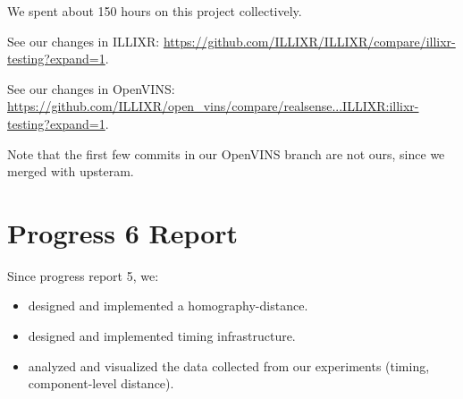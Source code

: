 \documentclass[sigconf,screen]{acmart}
\begin{document}
We spent about 150 hours on this project collectively.

See our changes in ILLIXR:
\url{https://github.com/ILLIXR/ILLIXR/compare/illixr-testing?expand=1}.

See our changes in OpenVINS:
\url{https://github.com/ILLIXR/open\_vins/compare/realsense...ILLIXR:illixr-testing?expand=1}.

Note that the first few commits in our OpenVINS branch are not ours, since we merged with upsteram.

\section{Progress 6 Report}

Since progress report 5, we:

\begin{itemize}
\item designed and implemented a homography-distance.
\item designed and implemented timing infrastructure.
\item analyzed and visualized the data collected from our experiments (timing, component-level distance).
\end{itemize}
\end{document}
